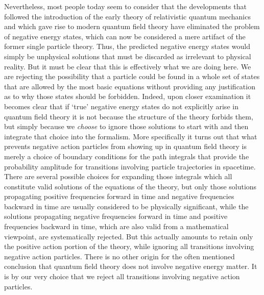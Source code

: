 \documentclass[notitlepage,12pt]{report}
\begin{document}
Nevertheless, most people today seem to consider that the developments that followed the introduction of the early theory of relativistic quantum mechanics and which gave rise to modern quantum field theory have eliminated the problem of negative energy states, which can now be considered a mere artifact of the former single particle theory. Thus, the predicted negative energy states would simply be unphysical solutions that must be discarded as irrelevant to physical reality. But it must be clear that this is effectively what we are doing here. We are rejecting the possibility that a particle could be found in a whole set of states that are allowed by the most basic equations without providing any justification as to why those states should be forbidden. Indeed, upon closer examination it becomes clear that if `true' negative energy states do not explicitly arise in quantum field theory it is not because the structure of the theory forbids them, but simply because we \textit{choose} to ignore those solutions to start with and then integrate that choice into the formalism. More specifically it turns out that what prevents negative action particles from showing up in quantum field theory is merely a choice of boundary conditions for the path integrals that provide the probability amplitude for transitions involving particle trajectories in spacetime. There are several possible choices for expanding those integrals which all constitute valid solutions of the equations of the theory, but only those solutions propagating positive frequencies forward in time and negative frequencies backward in time are usually considered to be physically significant, while the solutions propagating negative frequencies forward in time and positive frequencies backward in time, which are also valid from a mathematical viewpoint, are systematically rejected. But this actually amounts to retain only the positive action portion of the theory, while ignoring all transitions involving negative action particles. There is no other origin for the often mentioned conclusion that quantum field theory does not involve negative energy matter. It is by our very choice that we reject all transitions involving negative action particles.
\end{document}
